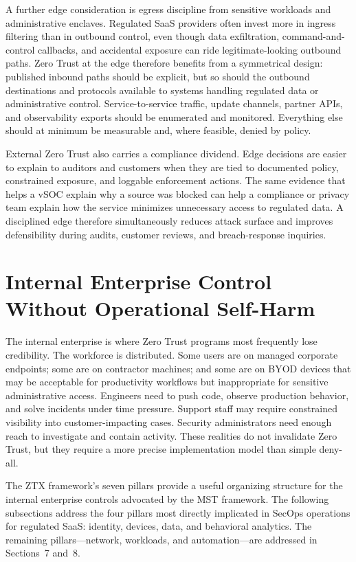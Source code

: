 \documentclass[unnumsec,webpdf,contemporary,large]{oup-authoring-template}
\theoremstyle{thmstyleone}
\theoremstyle{thmstyletwo}
\theoremstyle{thmstylethree}
\begin{document}
A further edge consideration is egress discipline from sensitive workloads and
administrative enclaves. Regulated SaaS providers often invest more in ingress filtering
than in outbound control, even though data exfiltration, command-and-control callbacks,
and accidental exposure can ride legitimate-looking outbound paths. Zero Trust at the edge
therefore benefits from a symmetrical design: published inbound paths should be explicit,
but so should the outbound destinations and protocols available to systems handling
regulated data or administrative control. Service-to-service traffic, update channels,
partner APIs, and observability exports should be enumerated and monitored. Everything
else should at minimum be measurable and, where feasible, denied by policy.

External Zero Trust also carries a compliance dividend. Edge decisions are easier to explain
to auditors and customers when they are tied to documented policy, constrained exposure,
and loggable enforcement actions. The same evidence that helps a vSOC explain why a source
was blocked can help a compliance or privacy team explain how the service minimizes
unnecessary access to regulated data. A disciplined edge therefore simultaneously reduces
attack surface and improves defensibility during audits, customer reviews, and
breach-response inquiries.

\section{Internal Enterprise Control Without Operational Self-Harm}

The internal enterprise is where Zero Trust programs most frequently lose credibility.
The workforce is distributed. Some users are on managed corporate endpoints; some are on
contractor machines; and some are on BYOD devices that may be acceptable for productivity
workflows but inappropriate for sensitive administrative access. Engineers need to push
code, observe production behavior, and solve incidents under time pressure. Support staff
may require constrained visibility into customer-impacting cases. Security administrators
need enough reach to investigate and contain activity. These realities do not invalidate
Zero Trust, but they require a more precise implementation model than simple deny-all.

The ZTX framework's seven pillars \cite{cunningham2018} provide a useful organizing
structure for the internal enterprise controls advocated by the MST framework. The
following subsections address the four pillars most directly implicated in SecOps
operations for regulated SaaS: identity, devices, data, and behavioral analytics. The
remaining pillars---network, workloads, and automation---are addressed in Sections~7 and~8.
\end{document}
